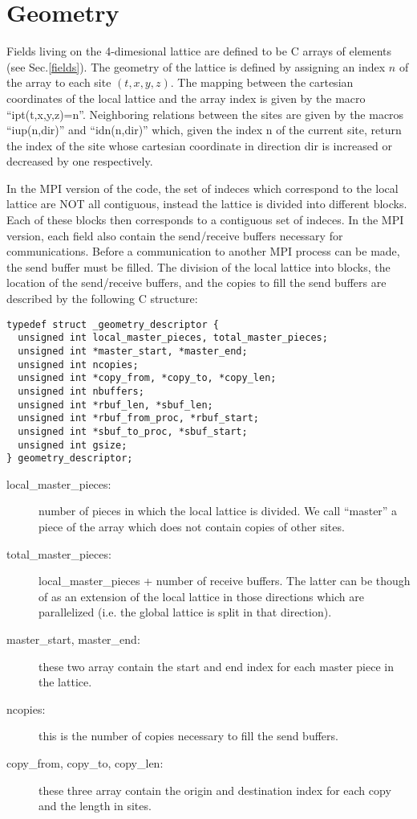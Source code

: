 \documentclass[10pt]{article}
\begin{document}
\section{Geometry}

Fields living on the 4-dimesional lattice are defined to be C arrays of elements (see Sec.\ref{fields}). 
The geometry of the lattice is defined by assigning an index $n$ of the array to each site $(t,x,y,z)$. The mapping between the cartesian coordinates of the local lattice and the array index is given by the macro ``ipt(t,x,y,z)=n''. Neighboring relations between the sites are given by the macros ``iup(n,dir)'' and ``idn(n,dir)'' which, given the index n of the current site,  return the index of the site whose cartesian coordinate in direction dir is increased or decreased by one respectively.

In the MPI version of the code, the set of indeces which correspond to the local lattice are NOT all contiguous, instead the lattice is divided into different blocks. Each of these blocks then corresponds to a contiguous set of indeces. In the MPI version, each field also contain the send/receive buffers necessary for communications. Before a communication to another MPI process can be made, the send buffer must be filled.
The division of the local lattice into blocks, the location of the send/receive buffers, and the copies to fill the send buffers are described by the following C structure:

\begin{verbatim}
typedef struct _geometry_descriptor {
  unsigned int local_master_pieces, total_master_pieces;
  unsigned int *master_start, *master_end;
  unsigned int ncopies;
  unsigned int *copy_from, *copy_to, *copy_len;
  unsigned int nbuffers;
  unsigned int *rbuf_len, *sbuf_len;
  unsigned int *rbuf_from_proc, *rbuf_start;
  unsigned int *sbuf_to_proc, *sbuf_start;
  unsigned int gsize;
} geometry_descriptor;
\end{verbatim}

\begin{description}
\item[local\_master\_pieces:] number of pieces in which the local lattice is divided. We call ``master'' a piece of the array which does not contain copies of other sites.
\item[total\_master\_pieces:] local\_master\_pieces + number of receive buffers. The latter can be though of as an extension of the local lattice in those directions which are parallelized (i.e. the global lattice is split in that direction).
\item[master\_start, master\_end:] these two array contain the start and end index for each master piece in the lattice.
\item[ncopies:] this is the number of copies necessary to fill the send buffers.
\item[copy\_from, copy\_to, copy\_len:] these three array contain the origin and destination index for each copy and the length in sites.
\item[]
\end{description}
\end{document}
